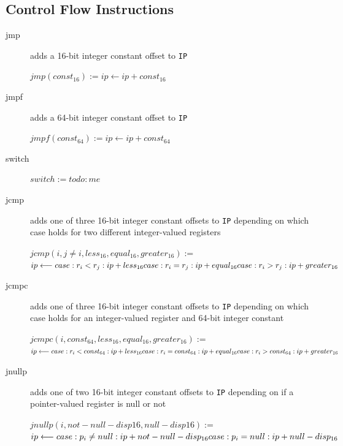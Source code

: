 \documentclass[english,a4paper]{article}
\begin{document}
\subsection{Control Flow Instructions}
\begin{description}
	\item[jmp] adds a 16-bit integer constant offset to \verb|IP|
	
	$jmp(const_{16}) := ip \longleftarrow ip + const_{16}$ \\
	\item[jmpf] adds a 64-bit integer constant offset to \verb|IP|
	
	$jmpf(const_{64}) := ip \longleftarrow ip + const_{64}$ \\
	\item[switch]
	
	$switch := todo: me$ \\
	\item[jcmp] adds one of three 16-bit integer constant offsets to
	\verb|IP| depending on which case holds for two different
	integer-valued registers
	
	$jcmp(i, j\neq i,less_{16},equal_{16},greater_{16}) :=$ \\
	$ ip \longleftarrow  \\
	case :r_{i} < r_{j}: ip + less_{16}   \\
	case :r_{i} = r_{j}: ip + equal_{16} \\
	case :r_{i} > r_{j}: ip + greater_{16}$ \\
	\item[jcmpc] adds one of three 16-bit integer constant offsets to
	\verb|IP| depending on which case holds for an integer-valued
	register and 64-bit integer constant
	
	$jcmpc (i, const_{64},less_{16},equal_{16},greater_{16}) :=$ \\
	$ ip \longleftarrow  \\
	case: r_{i} < const_{64}: ip + less_{16}   \\
	case: r_{i} = const_{64}: ip + equal_{16} \\
	case: r_{i} > const_{64}: ip + greater_{16}$
	\item[jnullp] adds one of two 16-bit integer constant offsets to
	\verb|IP| depending on if a pointer-valued register is null or not
	
	$jnullp(i,not-null-disp16,null-disp16) :=$ \\
	$ip \longleftarrow \\
	case: p_{i} \neq null: ip + not-null-disp_{16} \\
	case: p_{i} = null: ip + null-disp_{16}$ \\
\end{description}
\end{document}
